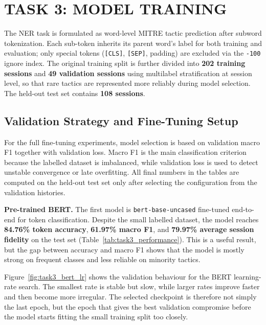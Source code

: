 \section{TASK 3: MODEL TRAINING} \label{sec:task3}

The NER task is formulated as word-level MITRE tactic prediction after
subword tokenization. Each sub-token inherits its parent word's label for both
training and evaluation; only special tokens (\texttt{[CLS]}, \texttt{[SEP]},
padding) are excluded via the \texttt{-100} ignore index. The original
training split is further divided into \textbf{202 training sessions} and
\textbf{49 validation sessions} using multilabel stratification at session
level, so that rare tactics are represented more reliably during model
selection. The held-out test set contains \textbf{108 sessions}.

\subsection{Validation Strategy and Fine-Tuning Setup} \label{subsec:task3_setup}

For the full fine-tuning experiments, model selection is based on validation
macro F1 together with validation loss. Macro F1 is the main classification
criterion because the labelled dataset is imbalanced, while validation loss is
used to detect unstable convergence or late overfitting. All final numbers in
the tables are computed on the held-out test set only after selecting the
configuration from the validation histories.

\vspace{0.2em}

\noindent
\textbf{Pre-trained BERT.} The first model is \texttt{bert-base-uncased}
fine-tuned end-to-end for token classification. Despite the small labelled
dataset, the model reaches \textbf{84.76\% token accuracy}, \textbf{61.97\%
macro F1}, and \textbf{79.97\% average session fidelity} on the test set
(Table~\ref{tab:task3_performance}). This is a useful result, but the gap
between accuracy and macro F1 shows that the model is mostly strong on frequent
classes and less reliable on minority tactics.

Figure~\ref{fig:task3_bert_lr} shows the validation behaviour for the BERT
learning-rate search. The smallest rate is stable but slow, while larger rates
improve faster and then become more irregular. The selected checkpoint is
therefore not simply the last epoch, but the epoch that gives the best
validation compromise before the model starts fitting the small training split
too closely.

